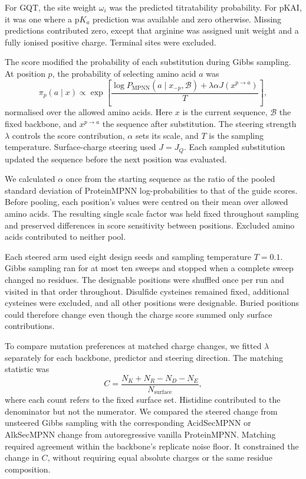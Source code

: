 For GQT, the site weight $\omega_i$ was the predicted titratability probability. For pKAI, it was one where a $\mathrm{p}K_a$ prediction was available and zero otherwise. Missing predictions contributed zero, except that arginine was assigned unit weight and a fully ionised positive charge. Terminal sites were excluded.

The score modified the probability of each substitution during Gibbs sampling. At position $p$, the probability of selecting amino acid $a$ was
\begin{equation}
    \pi_p(a\mid x)\propto
    \exp\!\left[
    \frac{
    \log P_{\mathrm{MPNN}}(a\mid x_{-p},\mathcal B)
    +\lambda\alpha J(x^{p\rightarrow a})
    }{T}
    \right],
    \label{eq:jaxka-guided-sampling}
\end{equation}
normalised over the allowed amino acids. Here $x$ is the current sequence, $\mathcal B$ the fixed backbone, and $x^{p\rightarrow a}$ the sequence after substitution. The steering strength $\lambda$ controls the score contribution, $\alpha$ sets its scale, and $T$ is the sampling temperature. Surface-charge steering used $J=J_Q$. Each sampled substitution updated the sequence before the next position was evaluated.

We calculated $\alpha$ once from the starting sequence as the ratio of the pooled standard deviation of ProteinMPNN log-probabilities to that of the guide scores. Before pooling, each position's values were centred on their mean over allowed amino acids. The resulting single scale factor was held fixed throughout sampling and preserved differences in score sensitivity between positions. Excluded amino acids contributed to neither pool.

Each steered arm used eight design seeds and sampling temperature $T=0.1$. Gibbs sampling ran for at most ten sweeps and stopped when a complete sweep changed no residues. The designable positions were shuffled once per run and visited in that order throughout. Disulfide cysteines remained fixed, additional cysteines were excluded, and all other positions were designable. Buried positions could therefore change even though the charge score summed only surface contributions.

To compare mutation preferences at matched charge changes, we fitted $\lambda$ separately for each backbone, predictor and steering direction. The matching statistic was
\begin{equation}
    C=\frac{N_K+N_R-N_D-N_E}{N_{\mathrm{surface}}},
    \label{eq:jaxka-charge-matching}
\end{equation}
where each count refers to the fixed surface set. Histidine contributed to the denominator but not the numerator. We compared the steered change from unsteered Gibbs sampling with the corresponding AcidSecMPNN or AlkSecMPNN change from autoregressive vanilla ProteinMPNN. Matching required agreement within the backbone's replicate noise floor. It constrained the change in $C$, without requiring equal absolute charges or the same residue composition.

